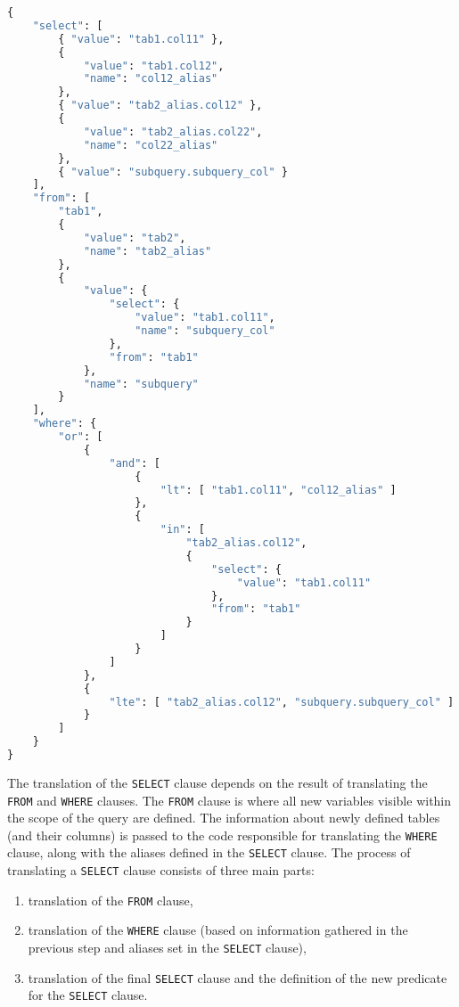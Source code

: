 \documentclass[magisterska,en]{pracamgr}
\newcommand{\code}[1]{\texttt{#1}}
\begin{document}
\begin{lstlisting}[language=Python, caption=Abstract syntax tree representation in Python]
{
    "select": [
        { "value": "tab1.col11" },
        {
            "value": "tab1.col12",
            "name": "col12_alias"
        },
        { "value": "tab2_alias.col12" },
        {
            "value": "tab2_alias.col22",
            "name": "col22_alias"
        },
        { "value": "subquery.subquery_col" }
    ],
    "from": [
        "tab1",
        {
            "value": "tab2",
            "name": "tab2_alias"
        },
        {
            "value": {
                "select": {
                    "value": "tab1.col11",
                    "name": "subquery_col"
                },
                "from": "tab1"
            },
            "name": "subquery"
        }
    ],
    "where": {
        "or": [
            {
                "and": [
                    {
                        "lt": [ "tab1.col11", "col12_alias" ]
                    },
                    {
                        "in": [
                            "tab2_alias.col12",
                            {
                                "select": {
                                    "value": "tab1.col11"
                                },
                                "from": "tab1"
                            }
                        ]
                    }
                ]
            },
            {
                "lte": [ "tab2_alias.col12", "subquery.subquery_col" ]
            }
        ]
    }
}

\end{lstlisting}

The translation of the \code{SELECT} clause depends on the result of translating the \code{FROM} and \code{WHERE} clauses. The \code{FROM} clause is where all new variables visible within the scope of the query are defined. The information about newly defined tables (and their columns) is passed to the code responsible for translating the \code{WHERE} clause, along with the aliases defined in the \code{SELECT} clause. The process of translating a \code{SELECT} clause consists of three main parts:
\begin{enumerate}
    \item translation of the \code{FROM} clause, 
    \item translation of the \code{WHERE} clause (based on information gathered in the previous step and aliases set in the \code{SELECT} clause),
    \item translation of the final \code{SELECT} clause and the definition of the new predicate for the \code{SELECT} clause.
\end{enumerate}
\end{document}

